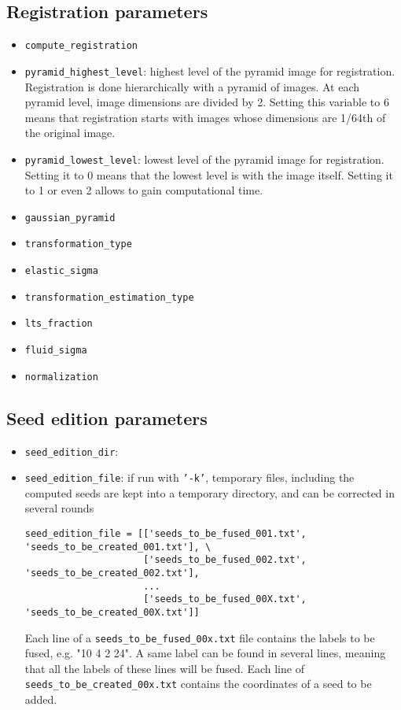 \subsection{Registration parameters}
\label{sec:cli:parameters:registration}

\begin{itemize}
\itemsep -0.5ex
\item \texttt{compute\_registration}
\item \texttt{pyramid\_highest\_level}:
  highest level of the pyramid image for registration.
  Registration is done hierarchically with a pyramid of images. At 
  each pyramid level, image dimensions are divided by 2.
  Setting this variable to 6 means that registration starts with images 
  whose dimensions are 1/64th of the original image.
\item \texttt{pyramid\_lowest\_level}:
  lowest level of the pyramid image for registration. Setting it
  to 0 means that the lowest level is with the image itself.
  Setting it to 1 or even 2 allows to gain computational time.
\item \texttt{gaussian\_pyramid}
\item \texttt{transformation\_type}
\item \texttt{elastic\_sigma}
\item \texttt{transformation\_estimation\_type}
\item \texttt{lts\_fraction}
\item \texttt{fluid\_sigma}
\item \texttt{normalization}
\end{itemize}










\subsection{Seed edition parameters}
\label{sec:cli:parameters:seed:edition}

\begin{itemize}
\itemsep -0.5ex
\item \texttt{seed\_edition\_dir}:
\item \texttt{seed\_edition\_file}:
  if run with \texttt{'-k'}, temporary files, including the computed 
  seeds are kept into a temporary directory, and can be corrected in
  several rounds
\begin{verbatim}
seed_edition_file = [['seeds_to_be_fused_001.txt', 'seeds_to_be_created_001.txt'], \
                     ['seeds_to_be_fused_002.txt', 'seeds_to_be_created_002.txt'],
                     ...
                     ['seeds_to_be_fused_00X.txt', 'seeds_to_be_created_00X.txt']]
\end{verbatim}
  Each line of a \texttt{seeds\_to\_be\_fused\_00x.txt} file contains 
  the labels to be fused, e.g. "10 4 2 24". A same label can be found 
  in several lines, meaning that all the labels of these lines will be 
  fused. Each line of \texttt{seeds\_to\_be\_created\_00x.txt} contains 
  the coordinates of a seed to be added.
\end{itemize}


